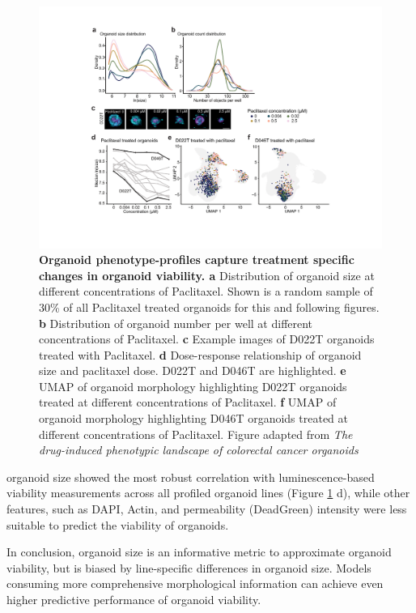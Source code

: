 \begin{flushleft}
\begin{figure}[H]
\centering
\includegraphics[width=\textwidth,
                height=\textheight,
                keepaspectratio]{figures/promise/pdf/fig_2_2.pdf}
\caption[Organoid phenotype-profiles capture treatment specific changes in organoid viability]{\textbf{Organoid phenotype-profiles capture treatment specific changes in organoid viability. a} Distribution of organoid size at different concentrations of Paclitaxel. Shown is a random sample of 30\% of all Paclitaxel treated organoids for this and following figures. \textbf{b} Distribution of organoid number per well at different concentrations of Paclitaxel. \textbf{c} Example images of D022T organoids treated with Paclitaxel. \textbf{d} Dose-response relationship of organoid size and paclitaxel dose. D022T and D046T are highlighted. \textbf{e} UMAP of organoid morphology highlighting D022T organoids treated at different concentrations of Paclitaxel. \textbf{f} UMAP of organoid morphology highlighting D046T organoids treated at different concentrations of Paclitaxel. Figure adapted from \textit{The drug-induced phenotypic landscape of colorectal cancer organoids} \citep{betgeDruginducedPhenotypicLandscape2022}}
\label{fig_222}
\end{figure}
\bigbreak

organoid size showed the most robust correlation with luminescence-based viability measurements across all profiled organoid lines (Figure \ref{fig_222} d), while other features, such as DAPI, Actin, and permeability (DeadGreen) intensity were less suitable to predict the viability of organoids. 

\bigbreak
In conclusion, organoid size is an informative metric to approximate organoid viability, but is biased by line-specific differences in organoid size. Models consuming more comprehensive morphological information can achieve even higher predictive performance of organoid viability. 


\end{flushleft}
